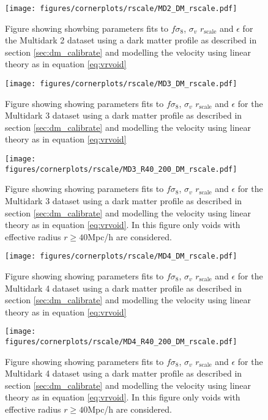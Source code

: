 \begin{figure}[H]
    \texttt{[image: figures/cornerplots/rscale/MD2\_DM\_rscale.pdf]}
    \caption{Figure showing showbing parameters fits to $f\sigma_8$, $\sigma_v$ $r_{\mathrm{scale}}$ and $\epsilon$ for the Multidark 2 dataset using a dark matter profile as described in section \ref{sec:dm_calibrate} and modelling the velocity using linear theory as in equation \ref{eq:vrvoid}}
    \label{fig:MD2DM}
\end{figure}

\begin{figure}[H]
    \texttt{[image: figures/cornerplots/rscale/MD3\_DM\_rscale.pdf]}
    \caption{Figure showing showing parameters fits to $f\sigma_8$, $\sigma_v$ $r_{\mathrm{scale}}$ and $\epsilon$ for the Multidark 3 dataset using a dark matter profile as described in section \ref{sec:dm_calibrate} and modelling the velocity using linear theory as in equation \ref{eq:vrvoid}}
    \label{fig:MD3DM}
\end{figure}

\begin{figure}[H]
    \texttt{[image: figures/cornerplots/rscale/MD3\_R40\_200\_DM\_rscale.pdf]}
    \caption{Figure showing showing parameters fits to $f\sigma_8$, $\sigma_v$ $r_{\mathrm{scale}}$ and $\epsilon$ for the Multidark 3 dataset using a dark matter profile as described in section \ref{sec:dm_calibrate} and modelling the velocity using linear theory as in equation \ref{eq:vrvoid}. In this figure only voids with effective radius $r \geq 40$Mpc/h are considered.}
    \label{fig:MD3DMR40}
\end{figure}

\begin{figure}[H]
    \texttt{[image: figures/cornerplots/rscale/MD4\_DM\_rscale.pdf]}
    \caption{Figure showing showing parameters fits to $f\sigma_8$, $\sigma_v$ $r_{\mathrm{scale}}$ and $\epsilon$ for the Multidark 4 dataset using a dark matter profile as described in section \ref{sec:dm_calibrate} and modelling the velocity using linear theory as in equation \ref{eq:vrvoid}}
    \label{fig:MD4DM}
\end{figure}

\begin{figure}[H]
    \texttt{[image: figures/cornerplots/rscale/MD4\_R40\_200\_DM\_rscale.pdf]}
    \caption{Figure showing showing parameters fits to $f\sigma_8$, $\sigma_v$ $r_{\mathrm{scale}}$ and $\epsilon$ for the Multidark 4 dataset using a dark matter profile as described in section \ref{sec:dm_calibrate} and modelling the velocity using linear theory as in equation \ref{eq:vrvoid}. In this figure only voids with effective radius $r \geq 40$Mpc/h are considered.}
    \label{fig:MD4DMR40}
\end{figure}

